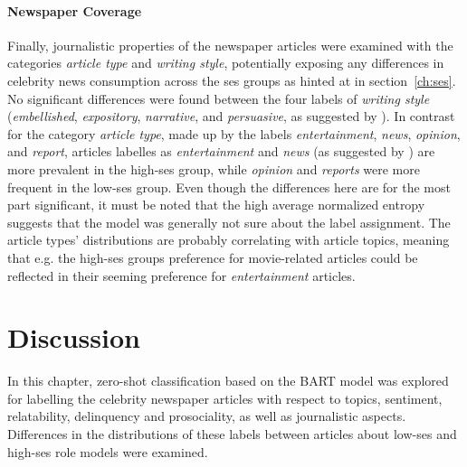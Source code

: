 \paragraph{Newspaper Coverage}
Finally, journalistic properties of the newspaper articles were examined with the categories \textit{article type} and \textit{writing style}, potentially exposing any differences in celebrity news consumption across the \gls{ses} groups as hinted at in section~\ref{ch:ses}. No significant differences were found between the four labels of \textit{writing style} (\textit{embellished}, \textit{expository}, \textit{narrative}, and \textit{persuasive}, as suggested by \textcite{traffis_learn_2017}). In contrast for the category \textit{article type}, made up by the labels \textit{entertainment}, \textit{news}, \textit{opinion}, and \textit{report}, articles labelles as \textit{entertainment} and \textit{news} (as suggested by \cite{davis_4_2022}) are more prevalent in the high-\gls{ses} group, while \textit{opinion} and \textit{reports} were more frequent in the low-\gls{ses} group. Even though the differences here are for the most part significant, it must be noted that the high average normalized entropy suggests that the model was generally not sure about the label assignment. The article types' distributions are probably correlating with article topics, meaning that e.g. the high-\gls{ses} groups preference for movie-related articles could be reflected in their seeming preference for \textit{entertainment} articles.

\section{Discussion}
In this chapter, zero-shot classification based on the BART model was explored for labelling the celebrity newspaper articles with respect to topics, sentiment, relatability, delinquency and prosociality, as well as journalistic aspects. Differences in the distributions of these labels between articles about low-\gls{ses} and high-\gls{ses} role models were examined.

